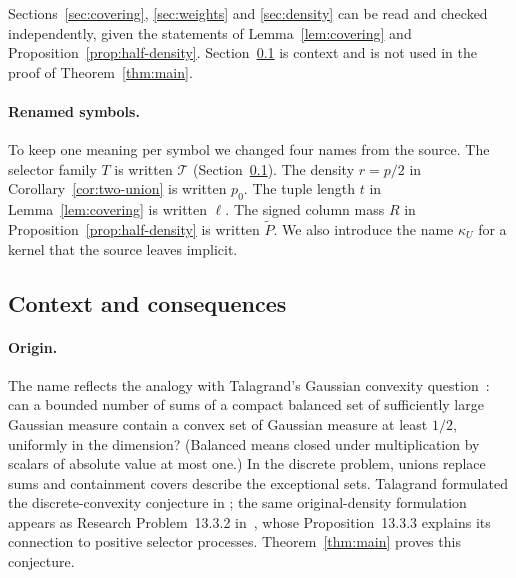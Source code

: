 \documentclass[11pt,letterpaper]{article}
\theoremstyle{definition}
\theoremstyle{remark}
\numberwithin{equation}{section}
\begin{document}
\begin{center}
\end{center}

Sections~\ref{sec:covering}, \ref{sec:weights} and \ref{sec:density} can be
read and checked independently, given the statements of
Lemma~\ref{lem:covering} and Proposition~\ref{prop:half-density}.
Section~\ref{sec:context} is context and is not used in the proof of
Theorem~\ref{thm:main}.

\paragraph{Renamed symbols.}
To keep one meaning per symbol we changed four names from the source. The
selector family $T$ is written $\mathcal T$ (Section~\ref{sec:context}). The
density $r=p/2$ in Corollary~\ref{cor:two-union} is written $p_0$. The tuple
length $t$ in Lemma~\ref{lem:covering} is written $\ell$. The signed column
mass $R$ in Proposition~\ref{prop:half-density} is written $\widetilde P$. We
also introduce the name $\kappa_U$ for a kernel that the source leaves
implicit.

\subsection{Context and consequences}
\label{sec:context}

\paragraph{Origin.}
The name reflects the analogy with Talagrand's Gaussian convexity
question~\cite[Conjecture~2.1]{Talagrand10}: can a bounded number of
sums of a compact balanced set of sufficiently large Gaussian measure
contain a convex set of Gaussian measure at least $1/2$, uniformly in
the dimension? (Balanced means closed under multiplication by scalars of
absolute value at most one.) In the discrete problem, unions replace sums and
containment covers describe the exceptional sets. Talagrand formulated the
discrete-convexity conjecture in \cite[Conjecture~7.1]{Talagrand10}; the same
original-density formulation appears as Research Problem~13.3.2
in~\cite{Talagrand21}, whose Proposition~13.3.3 explains its connection to
positive selector processes. Theorem~\ref{thm:main} proves this conjecture.
\end{document}

